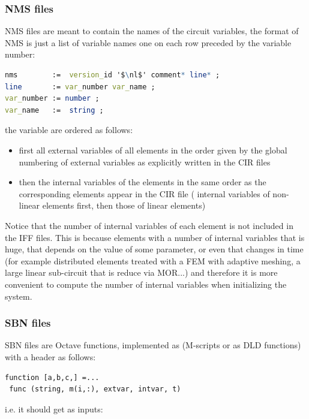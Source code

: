 \documentclass{scrartcl}
\let\tt=\normalfont\ttfamily
\newcommand{\Iff}{{\tt IFF}}
\newcommand{\cir}{{\tt CIR}}
\newcommand{\nms}{{\tt NMS}}
\newcommand{\sbn}{{\tt SBN}}
\newcommand{\nl}{{\tt \backslash n}}
\newcommand{\oct}{{\tt Octave}}
\begin{document}
\subsubsection{{\nms} files}

{\nms} files are meant to contain the names of the circuit variables, 
the format of {\nms} is just a list
of variable names one on each row preceded by the variable number:

\begin{lstlisting}[language=Mathematica,mathescape=true,backgroundcolor={}]
nms        :=  version_id '$\nl$' comment* line* ;
line       := var_number var_name ;
var_number := number ;
var_name   :=  string ;
\end{lstlisting}

the variable are ordered as follows:
\begin{itemize}
\item first all external variables of all elements 
in the order given by the global numbering of external variables as 
explicitly written in the {\cir} 
files
\item then the internal variables of the elements in the same order as the
corresponding elements appear in the {\cir} file 
( internal variables of non-linear elements first, then those of linear elements)
\end{itemize}

Notice that the number of internal variables of each element is not included 
in the {\Iff} files. 
This is because elements with a number of internal variables that is huge, that depends on the value of some parameter, or even that changes in time (for example distributed elements treated with a FEM with adaptive meshing, a large linear sub-circuit that is reduce via MOR...) and therefore it is more convenient to compute the number of internal variables when initializing the system.

\subsubsection{{\sbn} files} \label{ssecsbn}

{\sbn} files are {\oct} functions, implemented as (M-scripts or as 
DLD functions) with a header as follows:

\begin{lstlisting}
function [a,b,c,] =...
 func (string, m(i,:), extvar, intvar, t)
\end{lstlisting}

i.e. it should get as inputs:
\end{document}
